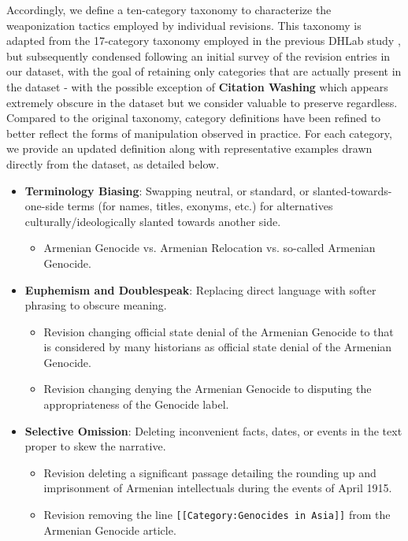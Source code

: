 \documentclass[11pt, a4paper, twoside, openright]{article} %
\begin{document}
Accordingly, we define a ten-category taxonomy to characterize the weaponization tactics employed by individual revisions. This taxonomy is adapted from the 17-category taxonomy employed in the previous DHLab study \cite{hidri2025weaponization}, but subsequently condensed following an initial survey of the revision entries in our dataset, with the goal of retaining only categories that are actually present in the dataset - with the possible exception of \textbf{Citation Washing} which appears extremely obscure in the dataset but we consider valuable to preserve regardless. Compared to the original taxonomy, category definitions have been refined to better reflect the forms of manipulation observed in practice. For each category, we provide an updated definition along with representative examples drawn directly from the dataset, as detailed below.
\begin{itemize}
    \item \textbf{Terminology Biasing}: Swapping neutral, or standard, or slanted-towards-one-side terms (for names, titles, exonyms, etc.) for alternatives culturally/ideologically slanted towards another side.
    \begin{itemize}
        \item Armenian Genocide vs. Armenian Relocation vs. so-called Armenian Genocide.
    \end{itemize}

    \item \textbf{Euphemism and Doublespeak}: Replacing direct language with softer phrasing to obscure meaning.
    \begin{itemize}
        \item Revision changing official state denial of the Armenian Genocide to that is considered by many historians as official state denial of the Armenian Genocide.
        \item Revision changing denying the Armenian Genocide to disputing the appropriateness of the Genocide label.
    \end{itemize}

    \item \textbf{Selective Omission}: Deleting inconvenient facts, dates, or events in the text proper to skew the narrative.
    \begin{itemize}
        \item Revision deleting a significant passage detailing the rounding up and imprisonment of Armenian intellectuals during the events of April 1915.
        \item Revision removing the line \texttt{[[Category:Genocides in Asia]]} from the Armenian Genocide article.
    \end{itemize}


\end{itemize}
\end{document}
